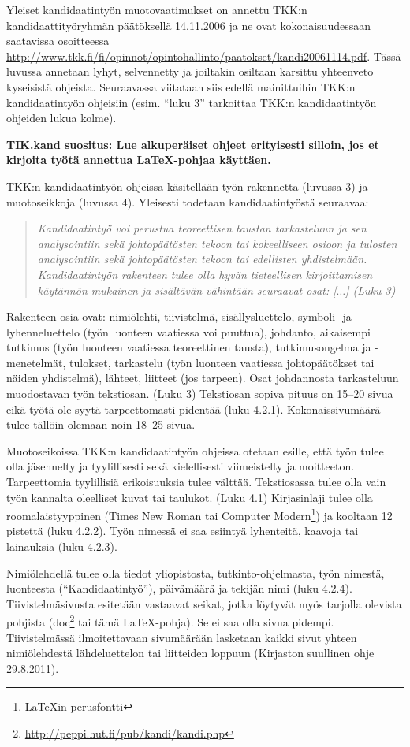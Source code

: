 Yleiset kandidaatintyön muotovaatimukset on annettu TKK:n
kandidaattityöryhmän päätöksellä 14.11.2006 ja ne ovat
kokonaisuudessaan saatavissa osoitteessa
\url{http://www.tkk.fi/fi/opinnot/opintohallinto/paatokset/kandi20061114.pdf}.
Tässä luvussa annetaan lyhyt, selvennetty ja joiltakin osiltaan
karsittu yhteenveto kyseisistä ohjeista. Seuraavassa viitataan siis
edellä mainittuihin TKK:n kandidaatintyön ohjeisiin (esim. ``luku 3''
tarkoittaa TKK:n kandidaatintyön ohjeiden lukua kolme).

\textbf{TIK.kand suositus: Lue alkuperäiset ohjeet erityisesti
  silloin, jos et kirjoita työtä annettua \LaTeX{}-pohjaa käyttäen.}

TKK:n kandidaatintyön ohjeissa käsitellään työn rakennetta (luvussa 3)
ja muotoseikkoja (luvussa 4). Yleisesti todetaan kandidaatintyöstä
seuraavaa:
%
\begin{quotation}
\noindent \it
Kandidaatintyö voi perustua teoreettisen taustan tarkasteluun 
ja sen analysointiin sekä johtopäätösten tekoon tai kokeelliseen osioon ja 
tulosten analysointiin sekä johtopäätösten tekoon
tai edellisten yhdistelmään.
Kandidaatintyön rakenteen tulee olla hyvän tieteellisen kirjoittamisen 
käytännön mukainen
ja sisältävän vähintään seuraavat osat: [$\ldots$] (Luku 3)
\end{quotation}

Rakenteen osia ovat: nimiölehti, tiivistelmä, sisällysluettelo,
symboli- ja lyhenneluettelo (työn luonteen vaatiessa voi puuttua),
johdanto, aikaisempi tutkimus (työn luonteen vaatiessa teoreettinen
tausta), tutkimusongelma ja -menetelmät, tulokset, tarkastelu (työn
luonteen vaatiessa johtopäätökset tai näiden yhdistelmä), lähteet,
liitteet (jos tarpeen). Osat johdannosta tarkasteluun muodostavan työn
tekstiosan. (Luku 3) Tekstiosan sopiva pituus on 15--20 sivua eikä
työtä ole syytä tarpeettomasti pidentää (luku 4.2.1).
Kokonaissivumäärä tulee tällöin olemaan noin 18--25 sivua.

Muotoseikoissa TKK:n kandidaatintyön ohjeissa otetaan esille, että
työn tulee olla jäsennelty ja tyylillisesti sekä kielellisesti
viimeistelty ja moitteeton.  Tarpeettomia tyylillisiä erikoisuuksia
tulee välttää.  Tekstiosassa tulee olla vain työn kannalta oleelliset
kuvat tai taulukot. (Luku 4.1)
%
Kirjasinlaji tulee olla roomalaistyyppinen (Times New Roman
tai Computer Modern\footnote{\LaTeX{}in perusfontti}) ja kooltaan 12 pistettä
(luku 4.2.2). 
%
Työn nimessä ei saa esiintyä lyhenteitä, kaavoja tai lainauksia
(luku 4.2.3).

Nimiölehdellä tulee olla tiedot yliopistosta, tutkinto-ohjelmasta,
työn nimestä, luonteesta (``Kandidaatintyö''), päivämäärä ja tekijän
nimi (luku 4.2.4). Tiivistelmäsivusta esitetään vastaavat seikat,
jotka löytyvät myös tarjolla olevista pohjista
(doc\footnote{\url{http://peppi.hut.fi/pub/kandi/kandi.php}} tai tämä
\LaTeX{}-pohja).  Se ei saa olla sivua pidempi. 
Tiivistelmässä
ilmoitettavaan sivumäärään lasketaan kaikki sivut yhteen 
nimiölehdestä lähdeluettelon tai liitteiden loppuun
(Kirjaston suullinen ohje 29.8.2011). 

